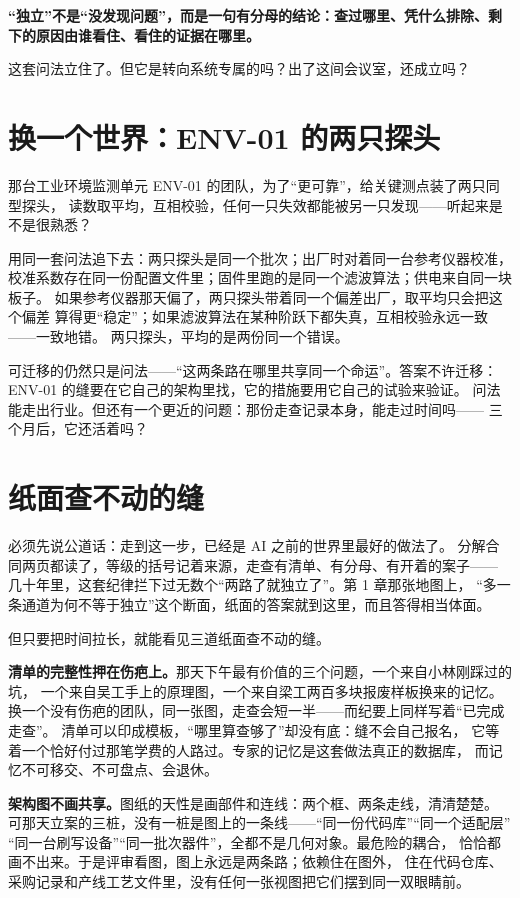 \textbf{“独立”不是“没发现问题”，而是一句有分母的结论：查过哪里、凭什么排除、剩下的原因由谁看住、看住的证据在哪里。}

这套问法立住了。但它是转向系统专属的吗？出了这间会议室，还成立吗？

\section{换一个世界：ENV-01 的两只探头}

那台工业环境监测单元 ENV-01 的团队，为了“更可靠”，给关键测点装了两只同型探头，
读数取平均，互相校验，任何一只失效都能被另一只发现——听起来是不是很熟悉？

用同一套问法追下去：两只探头是同一个批次；出厂时对着同一台参考仪器校准，
校准系数存在同一份配置文件里；固件里跑的是同一个滤波算法；供电来自同一块板子。
如果参考仪器那天偏了，两只探头带着同一个偏差出厂，取平均只会把这个偏差
算得更“稳定”；如果滤波算法在某种阶跃下都失真，互相校验永远一致——一致地错。
两只探头，平均的是两份同一个错误。

可迁移的仍然只是问法——“这两条路在哪里共享同一个命运”。答案不许迁移：
ENV-01 的缝要在它自己的架构里找，它的措施要用它自己的试验来验证。
问法能走出行业。但还有一个更近的问题：那份走查记录本身，能走过时间吗——
三个月后，它还活着吗？

\section{纸面查不动的缝}

必须先说公道话：走到这一步，已经是 AI 之前的世界里最好的做法了。
分解合同两页都读了，等级的括号记着来源，走查有清单、有分母、有开着的案子——
几十年里，这套纪律拦下过无数个“两路了就独立了”。第 1 章那张地图上，
“多一条通道为何不等于独立”这个断面，纸面的答案就到这里，而且答得相当体面。

但只要把时间拉长，就能看见三道纸面查不动的缝。

\textbf{清单的完整性押在伤疤上。}那天下午最有价值的三个问题，一个来自小林刚踩过的坑，
一个来自吴工手上的原理图，一个来自梁工两百多块报废样板换来的记忆。
换一个没有伤疤的团队，同一张图，走查会短一半——而纪要上同样写着“已完成走查”。
清单可以印成模板，“哪里算查够了”却没有底：缝不会自己报名，
它等着一个恰好付过那笔学费的人路过。专家的记忆是这套做法真正的数据库，
而记忆不可移交、不可盘点、会退休。

\textbf{架构图不画共享。}图纸的天性是画部件和连线：两个框、两条走线，清清楚楚。
可那天立案的三桩，没有一桩是图上的一条线——“同一份代码库”“同一个适配层”
“同一台刷写设备”“同一批次器件”，全都不是几何对象。最危险的耦合，
恰恰都画不出来。于是评审看图，图上永远是两条路；依赖住在图外，
住在代码仓库、采购记录和产线工艺文件里，没有任何一张视图把它们摆到同一双眼睛前。


